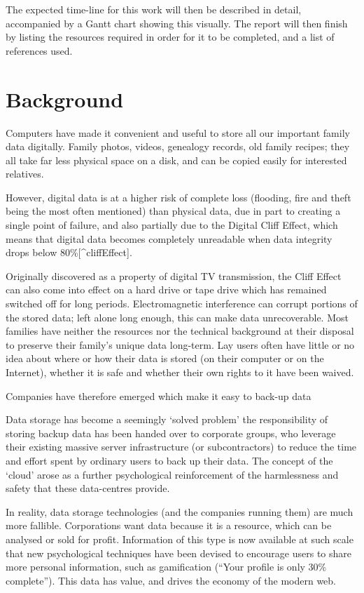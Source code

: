 \documentclass[12pt,a4paper,]{adreport}
\begin{document}
The expected time-line for this work will then be described in detail,
accompanied by a Gantt chart showing this visually. The report will then
finish by listing the resources required in order for it to be
completed, and a list of references used.

\chapter{Background}\label{background}

Computers have made it convenient and useful to store all our important
family data digitally. Family photos, videos, genealogy records, old
family recipes; they all take far less physical space on a disk, and can
be copied easily for interested relatives.

However, digital data is at a higher risk of complete loss (flooding,
fire and theft being the most often mentioned) than physical data, due
in part to creating a single point of failure, and also partially due to
the Digital Cliff Effect, which means that digital data becomes
completely unreadable when data integrity drops below
80\%{[}\^{}cliffEffect{]}.

Originally discovered as a property of digital TV transmission, the
Cliff Effect can also come into effect on a hard drive or tape drive
which has remained switched off for long periods. Electromagnetic
interference can corrupt portions of the stored data; left alone long
enough, this can make data unrecoverable. Most families have neither the
resources nor the technical background at their disposal to preserve
their family's unique data long-term. Lay users often have little or no
idea about where or how their data is stored (on their computer or on
the Internet), whether it is safe and whether their own rights to it
have been waived.

Companies have therefore emerged which make it easy to back-up data

Data storage has become a seemingly `solved problem' the responsibility
of storing backup data has been handed over to corporate groups, who
leverage their existing massive server infrastructure (or
subcontractors) to reduce the time and effort spent by ordinary users to
back up their data. The concept of the `cloud' arose as a further
psychological reinforcement of the harmlessness and safety that these
data-centres provide.

In reality, data storage technologies (and the companies running them)
are much more fallible. Corporations want data because it is a resource,
which can be analysed or sold for profit. Information of this type is
now available at such scale that new psychological techniques have been
devised to encourage users to share more personal information, such as
gamification (``Your profile is only 30\% complete''). This data has
value, and drives the economy of the modern web.
\end{document}
